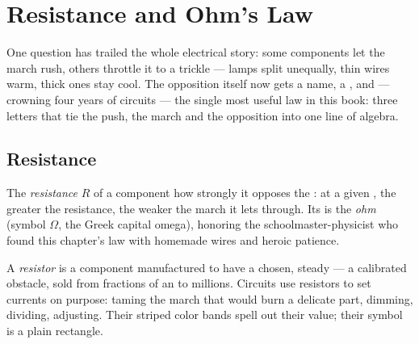 \chapter{Resistance and Ohm's Law}\label{ch:g8:ohms-law}

One question has trailed the whole electrical story: some
components let the march rush, others throttle it to a trickle
--- lamps split  unequally, thin wires warm, thick ones
stay cool. The opposition itself now gets a name, a , and
--- crowning four years of circuits --- the single most useful
law in this book: three letters that tie the push, the march
and the opposition into one line of algebra.

\section{Resistance}

\begin{definition}[Resistance]\label{def:g8:ohms-law:resistance}
The \emph{resistance} $R$ of a component
 how strongly it opposes the : at a
given , the greater the resistance, the weaker the
march it lets through. Its  is the \emph{ohm}
(symbol $\Omega$, the Greek capital omega), honoring the
schoolmaster-physicist who found this chapter's law with
homemade wires and heroic patience.
\end{definition}

\begin{definition}[Resistor]\label{def:g8:ohms-law:resistor}
A \emph{resistor} is a component manufactured
to have a chosen, steady  --- a calibrated obstacle,
sold from fractions of an  to millions. Circuits use
resistors to set currents on purpose: taming the march that
would burn a delicate part, dimming, dividing, adjusting.
Their striped color bands spell out their value; their symbol
is a plain rectangle.
\end{definition}

